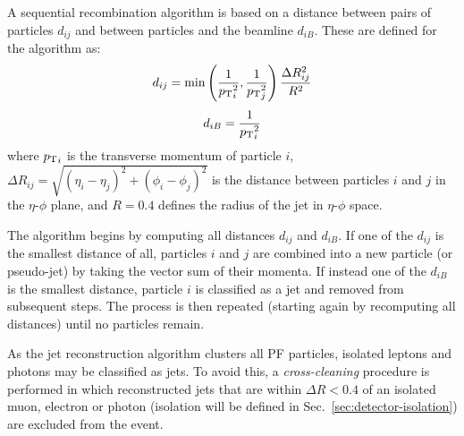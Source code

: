 A sequential recombination algorithm is based on a distance between pairs of 
particles $d_{ij}$ and between particles and the beamline $d_{iB}$. These are 
defined for the \antikt algorithm as:
\begin{equation}
d_{ij} = \mathrm{min} \left( \frac{1}{{p_{\text T}}_i^2}, \frac{1}{{p_{\text T}}_j^2} \right) 
\frac{\Delta R_{ij}^2}{R^2}
\end{equation}
\begin{equation}
d_{iB} = \frac{1}{{p_{\text T}}_i^2}
\end{equation}
where ${p_{\text T}}_i$ is the transverse momentum of particle $i$, 
$\Delta R_{ij}=\sqrt{(\eta_i - \eta_j)^2 + (\phi_i - \phi_j)^2}$ is the 
distance between particles $i$ and $j$ in the {$\eta$-$\phi$} plane, and 
$R=0.4$ defines the radius of the jet in {$\eta$-$\phi$} space.

The algorithm begins by computing all distances $d_{ij}$ and $d_{iB}$. If one 
of the $d_{ij}$ is the smallest distance of all, particles $i$ and $j$ are 
combined into a new particle (or pseudo-jet) by taking the vector sum of their 
momenta. 
If instead one of the $d_{iB}$ is the smallest distance, particle $i$ is 
classified as a jet and removed from subsequent steps. The process is then 
repeated (starting again by recomputing all distances) until no particles 
remain.



As the jet reconstruction algorithm clusters all PF particles, isolated leptons 
and photons may be classified as jets. To avoid this, a \textit{cross-cleaning} 
procedure is performed in which reconstructed jets that are within $\Delta R < 
0.4$ of an isolated muon, electron or photon (isolation will be defined in 
Sec.~\ref{sec:detector-isolation}) are excluded from the event.

